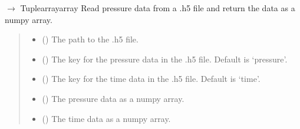 \documentclass[letterpaper,10pt,english]{sphinxmanual}
\begin{document}
\begin{fulllineitems}
\label{\detokenize{io:amiet_self_noise.io_utils.read_pressure_data}}
\pysigstartsignatures
\pysiglinewithargsret
{}
{\sphinxparamcomma {}\sphinxparamcomma {}}
{{ $\rightarrow$ Tuple\DUrole{p}{{[}}arrayarray\DUrole{p}{{]}}}}
\pysigstopsignatures
\sphinxAtStartPar
Read pressure data from a .h5 file and return the data as a numpy array.
\begin{quote}\begin{description}
\begin{itemize}
\item {} 
\sphinxAtStartPar
{} () \textendash{} The path to the .h5 file.

\item {} 
\sphinxAtStartPar
{} () \textendash{} The key for the pressure data in the .h5 file. Default is ‘pressure’.

\item {} 
\sphinxAtStartPar
{} () \textendash{} The key for the time data in the .h5 file. Default is ‘time’.

\end{itemize}

\sphinxAtStartPar
\begin{itemize}
\item {} 
\sphinxAtStartPar
{} () \textendash{} The pressure data as a numpy array.

\item {} 
\sphinxAtStartPar
{} () \textendash{} The time data as a numpy array.

\end{itemize}


\end{description}\end{quote}

\end{fulllineitems}
\end{document}
